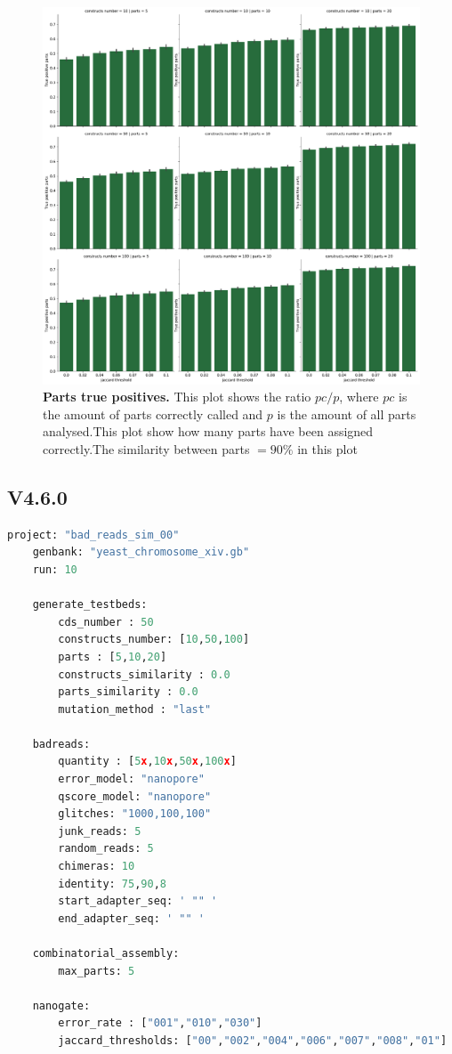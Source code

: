 \documentclass[11pt, a4paper]{article}
\begin{document}
 \begin{figure}[ht]
    \begin{center}
    \includegraphics[width=1.35\textwidth]{../results/images_notebook/v_450/sim_90_parts_positive.pdf}
    \end{center}
    \caption{{\bf Parts true positives.}  This plot shows the ratio $pc/p$, where $pc$ is the amount of parts correctly called and $p$ is the amount of all parts analysed.This plot show how many parts have been assigned correctly.The similarity between parts $=90\%$ in this plot}
   \label{fig:v_450_sim_90_parts_positives }
\end{figure}
\clearpage
\subsection{V4.6.0 }
\begin{lstlisting}[language=Python]
    project: "bad_reads_sim_00"
    genbank: "yeast_chromosome_xiv.gb"
    run: 10
    
    generate_testbeds:
        cds_number : 50
        constructs_number: [10,50,100]
        parts : [5,10,20]
        constructs_similarity : 0.0
        parts_similarity : 0.0
        mutation_method : "last"
    
    badreads:
        quantity : [5x,10x,50x,100x]
        error_model: "nanopore"
        qscore_model: "nanopore"
        glitches: "1000,100,100"
        junk_reads: 5
        random_reads: 5
        chimeras: 10
        identity: 75,90,8
        start_adapter_seq: ' "" '
        end_adapter_seq: ' "" '
    
    combinatorial_assembly:
        max_parts: 5
    
    nanogate:
        error_rate : ["001","010","030"]
        jaccard_thresholds: ["00","002","004","006","007","008","01"]

\end{lstlisting}
\end{document}
